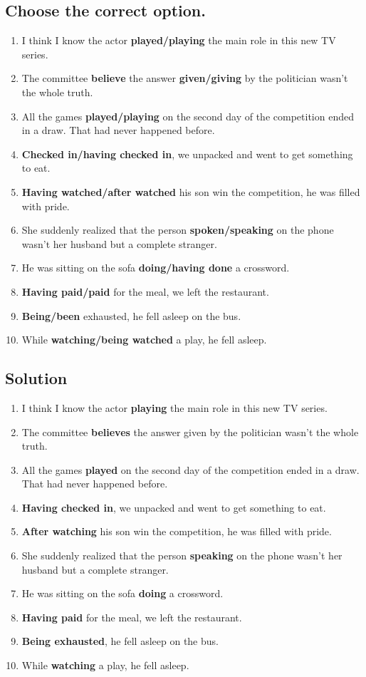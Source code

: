 \subsection*{Choose the correct option.}
\begin{enumerate}
      \item I think I know the actor \textbf{played/playing} the main role in this new TV series.
      \item The committee \textbf{believe} the answer \textbf{given/giving} by the politician wasn't the whole truth.
      \item All the games \textbf{played/playing} on the second day of the competition ended in a draw. That had never happened before.
      \item \textbf{Checked in/having checked in}, we unpacked and went to get something to eat.
      \item \textbf{Having watched/after watched} his son win the competition, he was filled with pride.
      \item She suddenly realized that the person \textbf{spoken/speaking} on the phone wasn't her husband but a complete stranger.
      \item He was sitting on the sofa \textbf{doing/having done} a crossword.
      \item \textbf{Having paid/paid} for the meal, we left the restaurant.
      \item \textbf{Being/been} exhausted, he fell asleep on the bus.
      \item While \textbf{watching/being watched} a play, he fell asleep.
\end{enumerate}

\subsection*{Solution}
\begin{enumerate}
      \item I think I know the actor \textbf{playing} the main role in this new TV series.
      \item The committee \textbf{believes} the answer given by the politician wasn't the whole truth.
      \item All the games \textbf{played} on the second day of the competition ended in a draw. That had never happened before.
      \item \textbf{Having checked in}, we unpacked and went to get something to eat.
      \item \textbf{After watching} his son win the competition, he was filled with pride.
      \item She suddenly realized that the person \textbf{speaking} on the phone wasn't her husband but a complete stranger.
      \item He was sitting on the sofa \textbf{doing} a crossword.
      \item \textbf{Having paid} for the meal, we left the restaurant.
      \item \textbf{Being exhausted}, he fell asleep on the bus.
      \item While \textbf{watching} a play, he fell asleep.
\end{enumerate}